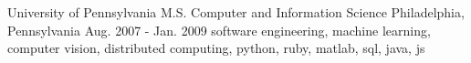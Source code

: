 \cventry
    {University of Pennsylvania} %
    {M.S. Computer and Information Science} %
    {Philadelphia, Pennsylvania} %
    {Aug. 2007 - Jan. 2009} %
    {software engineering, machine learning, computer vision, distributed computing, python, ruby, matlab, sql, java, js} %
    {
    }
